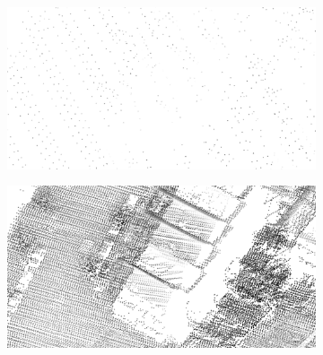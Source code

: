 \begin{figure}
	\centering
	\begin{subfigure}{0.45\linewidth}
		\includegraphics[width=\textwidth]{figs/ahn1_d.png}
		\label{fig:pcd:ahn1}
	\end{subfigure}
	\quad
	\begin{subfigure}{0.45\linewidth}
		\includegraphics[width=\textwidth]{figs/ahn2_d.png}
		\label{fig:pcd:ahn2}
	\end{subfigure}
	

\end{figure}
